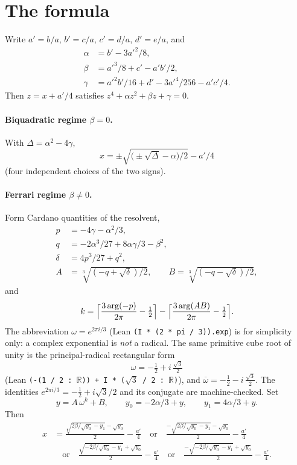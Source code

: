 \documentclass[11pt,a4paper]{article}
\newcommand{\Arg}{\operatorname{arg}}
\begin{document}
\section{The formula}
\label{sec:formula}

Write \(a'=b/a\), \(b'=c/a\), \(c'=d/a\), \(d'=e/a\), and
\begin{align*}
\alpha&=b'-3a'^2/8,\\
\beta&=a'^3/8+c'-a'b'/2,\\
\gamma&=a'^2 b'/16+d'-3a'^4/256-a'c'/4.
\end{align*}
Then \(z=x+a'/4\) satisfies \(z^4+\alpha z^2+\beta z+\gamma=0\).

\paragraph{Biquadratic regime \(\beta=0\).}
With \(\Delta=\alpha^2-4\gamma\),
\[
x=\pm\sqrt{\bigl(\pm\sqrt{\Delta}-\alpha\bigr)/2}-a'/4
\]
(four independent choices of the two signs).

\paragraph{Ferrari regime \(\beta\neq 0\).}
Form Cardano quantities of the resolvent,
\begin{align*}
p&=-4\gamma-\alpha^2/3,\\
q&=-2\alpha^3/27+8\alpha\gamma/3-\beta^2,\\
\delta&=4p^3/27+q^2,\\
A&=\sqrt[3]{(-q+\sqrt{\delta})/2},\qquad
B=\sqrt[3]{(-q-\sqrt{\delta})/2},
\end{align*}
and
\[
k=\Bigl\lceil\frac{3\Arg(-p)}{2\pi}-\tfrac12\Bigr\rceil
-\Bigl\lceil\frac{3\Arg(AB)}{2\pi}-\tfrac12\Bigr\rceil.
\]
The abbreviation \(\omega=e^{2\pi i/3}\) (Lean \nolinkurl{(I * (2 * pi / 3)).exp}) is for simplicity only: a complex exponential is \emph{not} a radical.
The same primitive cube root of unity is the principal-radical rectangular form
\[
\omega=-\tfrac12+i\,\tfrac{\sqrt{3}}{2}
\]
(Lean \texttt{(-(1 / 2 : $\mathbb{R}$)) + I * ($\sqrt{3}$ / 2 : $\mathbb{R}$)}), and \(\overline{\omega}=-\tfrac12-i\,\tfrac{\sqrt{3}}{2}\).
The identities \(e^{2\pi i/3}=-\tfrac12+i\sqrt{3}/2\) and its conjugate are machine-checked.
Set
\[
y=A\,\omega^{k}+B,\qquad
y_0=-2\alpha/3+y,\qquad
y_1=4\alpha/3+y.
\]
Then
\begin{align*}
x&=\frac{\sqrt{2\beta/\sqrt{y_0}-y_1}-\sqrt{y_0}}{2}-\frac{a'}{4}
\quad\text{or}\quad
\frac{-\sqrt{2\beta/\sqrt{y_0}-y_1}-\sqrt{y_0}}{2}-\frac{a'}{4}\\
&\quad\text{or}\quad
\frac{\sqrt{-2\beta/\sqrt{y_0}-y_1}+\sqrt{y_0}}{2}-\frac{a'}{4}
\quad\text{or}\quad
\frac{-\sqrt{-2\beta/\sqrt{y_0}-y_1}+\sqrt{y_0}}{2}-\frac{a'}{4}.
\end{align*}
\end{document}
